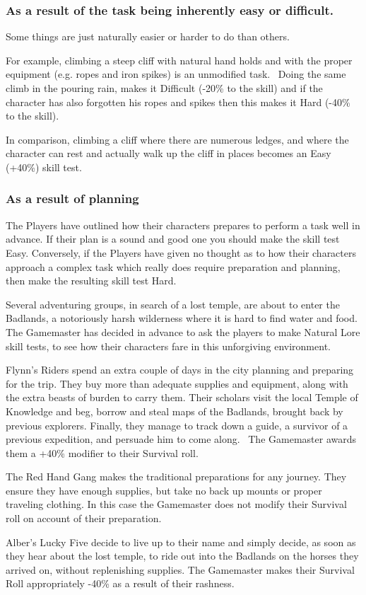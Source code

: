 \subsubsection{As a result of the task being inherently easy or difficult.}
Some things are just naturally easier or harder to do than others. 

For example, climbing a steep cliff with natural hand holds and with the proper equipment (e.g. ropes and iron spikes) is an unmodified task.  Doing the same climb in the pouring rain, makes it Difficult (-20\% to the skill) and if the character has also forgotten his ropes and spikes then this makes it Hard (-40\% to the skill).

In comparison, climbing a cliff where there are numerous ledges, and where the character can rest and actually walk up the cliff in places becomes an Easy (+40\%) skill test.


\subsubsection{As a result of planning}
The Players have outlined how their characters prepares to perform a task well in advance. If their plan is a sound and good one you should make the skill test Easy. Conversely, if the Players have given no thought as to how their characters approach a complex task which really does require preparation and planning, then make the resulting skill test Hard.

\begin{rpg-examplebox}
Several adventuring groups, in search of a lost temple, are about to enter the Badlands, a notoriously harsh wilderness where it is hard to find water and food. The Gamemaster has decided in advance to ask the players to make Natural Lore skill tests, to see how their characters fare in this unforgiving environment.

Flynn’s Riders spend an extra couple of days in the city planning and preparing for the trip. They buy more than adequate supplies and equipment, along with the extra beasts of burden to carry them. Their scholars visit the local Temple of Knowledge and beg, borrow and steal maps of the Badlands, brought back by previous explorers. Finally, they manage to track down a guide, a survivor of a previous expedition, and persuade him to come along.  The Gamemaster awards them a +40\% modifier to their Survival roll.

The Red Hand Gang makes the traditional preparations for any journey. They ensure they have enough supplies, but take no back up mounts or proper traveling clothing. In this case the Gamemaster does not modify their Survival roll on account of their preparation.

Alber’s Lucky Five decide to live up to their name and simply decide, as soon as they hear about the lost temple, to ride out into the Badlands on the horses they arrived on, without replenishing supplies. The Gamemaster makes their Survival Roll appropriately -40\% as a result of their rashness.
\end{rpg-examplebox}


